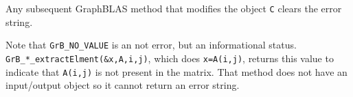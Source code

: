 \documentclass[12pt]{article}
\begin{document}
Any subsequent GraphBLAS method that modifies the object \verb'C' clears the
error string.

Note that \verb'GrB_NO_VALUE' is an not error, but an informational status.
\verb'GrB_*_extractElment(&x,A,i,j)', which does \verb'x=A(i,j)', returns this
value to indicate that \verb'A(i,j)' is not present in the matrix.  That
method does not have an input/output object so it cannot return an error
string.





\newpage
\end{document}
